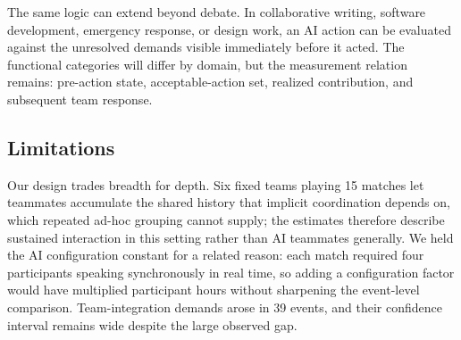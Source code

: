 \documentclass[manuscript,review,anonymous]{acmart}
\begin{document}
The same logic can extend beyond debate. In collaborative writing, software development, emergency response, or design work, an AI action can be evaluated against the unresolved demands visible immediately before it acted. The functional categories will differ by domain, but the measurement relation remains: pre-action state, acceptable-action set, realized contribution, and subsequent team response.

\subsection{Limitations}
Our design trades breadth for depth. Six fixed teams playing 15 matches let teammates accumulate the shared history that implicit coordination depends on, which repeated ad-hoc grouping cannot supply; the estimates therefore describe sustained interaction in this setting rather than AI teammates generally. We held the AI configuration constant for a related reason: each match required four participants speaking synchronously in real time, so adding a configuration factor would have multiplied participant hours without sharpening the event-level comparison. Team-integration demands arose in 39 events, and their confidence interval remains wide despite the large observed gap.
\end{document}
